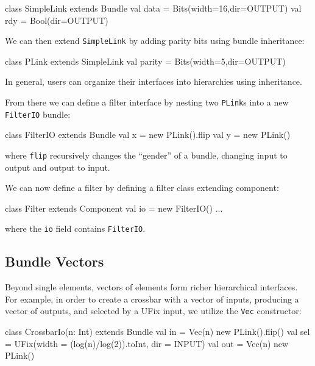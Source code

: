 \documentclass[twocolumn,10pt]{article}
\begin{document}
\begin{scala}
class SimpleLink extends Bundle { 
  val data = Bits(width=16,dir=OUTPUT) 
  val rdy  = Bool(dir=OUTPUT)
}
\end{scala}

\noindent
We can then extend \verb+SimpleLink+ by adding parity bits using
bundle inheritance:

\begin{scala}
class PLink extends SimpleLink { 
  val parity = Bits(width=5,dir=OUTPUT) 
}
\end{scala}

\noindent
In general, users can organize their interfaces into hierarchies using inheritance.  

From there we can define a filter interface by nesting two
\verb+PLink+s into a new \verb+FilterIO+ bundle:

\begin{scala}
class FilterIO extends Bundle { 
  val x = new PLink().flip
  val y = new PLink()
}
\end{scala}

\noindent
where \verb+flip+ recursively changes the ``gender'' of a bundle,
changing input to output and output to input.

We can now define a filter by defining a filter class extending component:

\begin{scala}
class Filter extends Component { 
  val io = new FilterIO()
  ...
}
\end{scala}

\noindent 
where the \verb+io+ field contains \verb+FilterIO+. 

\subsection{Bundle Vectors}

Beyond single elements, vectors of elements form richer hierarchical interfaces.  
For example, in order to create a crossbar with a vector of inputs, producing a vector of outputs, and selected by a UFix input, 
we utilize the \verb+Vec+ constructor:

\begin{scala}
class CrossbarIo(n: Int) extends Bundle {
  val in  = Vec(n){ new PLink().flip() }
  val sel = UFix(width = (log(n)/log(2)).toInt, dir = INPUT)
  val out = Vec(n){ new PLink() }
}
\end{scala}

\end{document}
